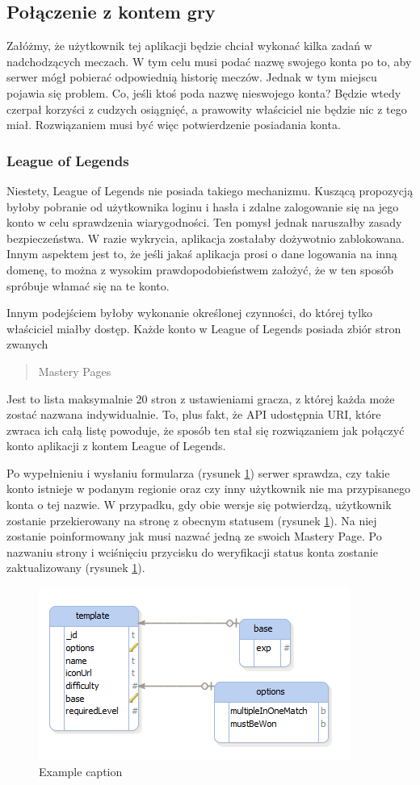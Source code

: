 \subsection{Połączenie z kontem gry}
		Załóżmy, że użytkownik tej aplikacji będzie chciał wykonać kilka zadań w nadchodzących meczach. W tym celu musi podać nazwę swojego konta po to, aby serwer mógł pobierać odpowiednią historię meczów. Jednak w tym miejscu pojawia się problem. Co, jeśli ktoś poda nazwę nieswojego konta? Będzie wtedy czerpał korzyści z cudzych osiągnięć, a prawowity właściciel nie będzie nic z tego miał. Rozwiązaniem musi być więc potwierdzenie posiadania konta.\par
	\subsubsection{League of Legends}
			Niestety, League of Legends nie posiada takiego mechanizmu. Kuszącą propozycją byłoby pobranie od użytkownika loginu i hasła i zdalne zalogowanie się na jego konto w celu sprawdzenia wiarygodności. Ten pomysł jednak naruszałby zasady bezpieczeństwa. W razie wykrycia, aplikacja zostałaby dożywotnio zablokowana. Innym aspektem jest to, że jeśli jakaś aplikacja prosi o dane logowania na inną domenę, to można z wysokim prawdopodobieństwem założyć, że w ten sposób spróbuje włamać się na te konto.\par
			Innym podejściem byłoby wykonanie określonej czynności, do której tylko właściciel miałby dostęp. Każde konto w League of Legends posiada zbiór stron zwanych \blockquote{Mastery Pages}. Jest to lista maksymalnie 20 stron z ustawieniami gracza, z której każda może zostać nazwana indywidualnie. To, plus fakt, że API udostępnia URI, które zwraca ich całą listę powoduje, że sposób ten stał się rozwiązaniem jak połączyć konto aplikacji z kontem League of Legends.\par
			Po wypełnieniu i wysłaniu formularza (rysunek \ref{img:exampleImage}) serwer sprawdza, czy takie konto istnieje w podanym regionie oraz czy inny użytkownik nie ma przypisanego konta o tej nazwie. W przypadku, gdy obie wersje się potwierdzą, użytkownik zostanie przekierowany na stronę z obecnym statusem (rysunek \ref{img:exampleImage}). Na niej zostanie poinformowany jak musi nazwać jedną ze swoich Mastery Page. Po nazwaniu strony i wciśnięciu przycisku do weryfikacji status konta zostanie zaktualizowany (rysunek \ref{img:exampleImage}).\\
\begin{figure}[!ht]
	\includegraphics[width=\linewidth]{img/exampleImage}
	\caption{Example caption}
	\label{img:exampleImage}
\end{figure}	